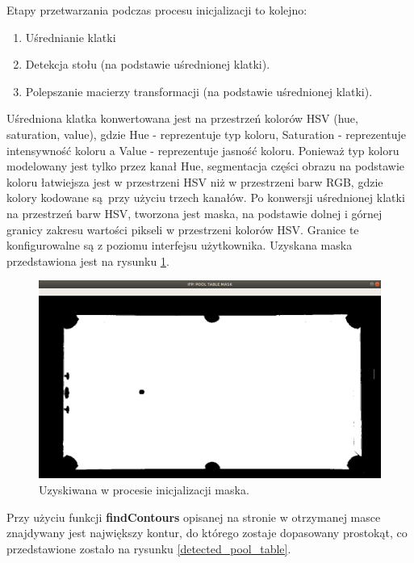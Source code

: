 \documentclass[12pt]{article}
\begin{document}
Etapy przetwarzania podczas procesu inicjalizacji to kolejno:
    \begin{enumerate} [noitemsep]
        \item Uśrednianie klatki
        \item Detekcja stołu (na podstawie uśrednionej klatki).
        \item Polepszanie macierzy transformacji (na podstawie uśrednionej klatki).
    \end{enumerate}
    
    Uśredniona klatka konwertowana jest na przestrzeń kolorów HSV (hue, saturation, value), gdzie Hue - reprezentuje typ koloru, Saturation - reprezentuje intensywność koloru a Value - reprezentuje jasność koloru. Ponieważ typ koloru modelowany jest tylko przez kanał Hue, segmentacja części obrazu na podstawie koloru łatwiejsza jest w przestrzeni HSV niż w przestrzeni barw RGB, gdzie kolory kodowane są przy użyciu trzech kanałów.
    Po konwersji uśrednionej klatki na przestrzeń barw HSV, tworzona jest maska, na podstawie dolnej i górnej granicy zakresu wartości pikseli w przestrzeni kolorów HSV. Granice te konfigurowalne są z poziomu interfejsu użytkownika. Uzyskana maska przedstawiona jest na rysunku \ref{pool_table_mask}.

    \begin{figure}[!htb]
        \centering
        \includegraphics[width=15cm]{./images/obrazki/inicjalizacja/pool_table_mask.png}
        \caption{Uzyskiwana w procesie inicjalizacji maska.}
        \label{pool_table_mask}
    \end{figure}


        Przy użyciu funkcji \textbf{findContours} opisanej na stronie \cite{FindContours} w otrzymanej masce znajdywany jest największy kontur, do którego zostaje dopasowany prostokąt, co przedstawione zostało na rysunku \ref{detected_pool_table}.
\end{document}
